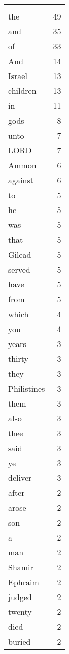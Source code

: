 \begin{center}
\begin{longtable}{l|r}
\hline \multicolumn{2}{c}{{ }} \\ \hline
\endfoot 
the & 49\\ \hline 
and & 35\\ \hline 
of & 33\\ \hline 
And & 14\\ \hline 
Israel & 13\\ \hline 
children & 13\\ \hline 
in & 11\\ \hline 
gods & 8\\ \hline 
unto & 7\\ \hline 
LORD & 7\\ \hline 
Ammon & 6\\ \hline 
against & 6\\ \hline 
to & 5\\ \hline 
he & 5\\ \hline 
was & 5\\ \hline 
that & 5\\ \hline 
Gilead & 5\\ \hline 
served & 5\\ \hline 
have & 5\\ \hline 
from & 5\\ \hline 
which & 4\\ \hline 
you & 4\\ \hline 
years & 3\\ \hline 
thirty & 3\\ \hline 
they & 3\\ \hline 
Philistines & 3\\ \hline 
them & 3\\ \hline 
also & 3\\ \hline 
thee & 3\\ \hline 
said & 3\\ \hline 
ye & 3\\ \hline 
deliver & 3\\ \hline 
after & 2\\ \hline 
arose & 2\\ \hline 
son & 2\\ \hline 
a & 2\\ \hline 
man & 2\\ \hline 
Shamir & 2\\ \hline 
Ephraim & 2\\ \hline 
judged & 2\\ \hline 
twenty & 2\\ \hline 
died & 2\\ \hline 
buried & 2\\ \hline 

\end{longtable}
\end{center}

